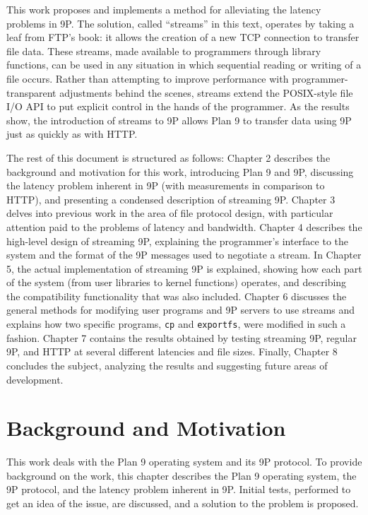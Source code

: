\documentclass[11pt,american]{report}
\begin{document}
This work proposes and implements a method for alleviating the latency problems in 9P. The solution, called ``streams'' in this text, operates by taking a leaf from FTP's book: it allows the creation of a new TCP connection to transfer file data. These streams, made available to programmers through library functions, can be used in any situation in which sequential reading or writing of a file occurs. Rather than attempting to improve performance with programmer-transparent adjustments behind the scenes, streams extend the POSIX-style file I/O API to put explicit control in the hands of the programmer. As the results show, the introduction of streams to 9P allows Plan 9 to transfer data using 9P just as quickly as with HTTP.

The rest of this document is structured as follows: Chapter 2 describes the background and motivation for this work, introducing Plan 9 and 9P, discussing the latency problem inherent in 9P (with measurements in comparison to HTTP), and presenting a condensed description of streaming 9P. Chapter 3 delves into previous work in the area of file protocol design, with particular attention paid to the problems of latency and bandwidth. Chapter 4 describes the high-level design of streaming 9P, explaining the programmer's interface to the system and the format of the 9P messages used to negotiate a stream. In Chapter 5, the actual implementation of streaming 9P is explained, showing how each part of the system (from user libraries to kernel functions) operates, and describing the compatibility functionality that was also included. Chapter 6 discusses the general methods for modifying user programs and 9P servers to use streams and explains how two specific programs, {\tt cp} and {\tt exportfs}, were modified in such a fashion. Chapter 7 contains the results obtained by testing streaming 9P, regular 9P, and HTTP at several different latencies and file sizes. Finally, Chapter 8 concludes the subject, analyzing the results and suggesting future areas of development.

\chapter{Background and Motivation}

This work deals with the Plan 9 operating system and its 9P protocol. To provide background on the work, this chapter describes the Plan 9 operating system, the 9P protocol, and the latency problem inherent in 9P. Initial tests, performed to get an idea of the issue, are discussed, and a solution to the problem is proposed.
\end{document}
